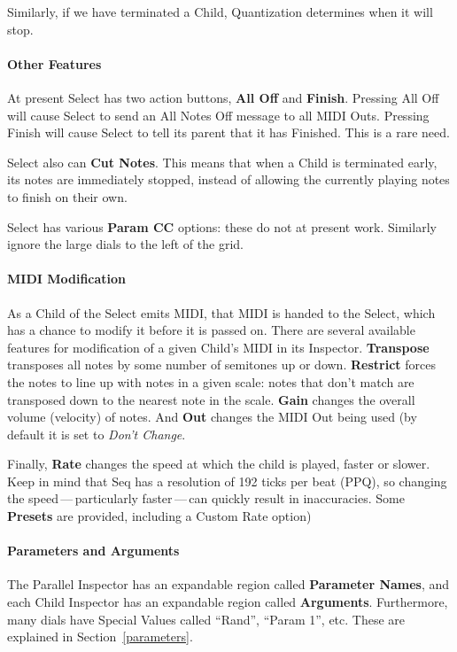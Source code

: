 \documentclass[twoside,10pt]{article}
\begin{document}
Similarly, if we have terminated a Child, Quantization determines when it will stop.

\paragraph{Other Features}

At present Select has two action buttons, {\bf All Off} and {\bf Finish}.  Pressing All Off will cause Select to send an All Notes Off message to all MIDI Outs.  Pressing Finish will cause Select to tell its parent that it has Finished.  This is a rare need.

Select also can {\bf Cut Notes}.  This means that when a Child is terminated early, its notes are immediately stopped, instead of allowing the currently playing notes to finish on their own.

Select has various {\bf Param CC} options: {\color{red} these do not at present work.}  Similarly ignore the large dials to the left of the grid.

\paragraph{MIDI Modification}

As a Child of the Select emits MIDI, that MIDI is handed to the Select, which has a chance to modify it before it is passed on.  There are several available features for modification of a given Child's MIDI in its Inspector.  {\bf Transpose} transposes all notes by some number of semitones up or down.  {\bf Restrict} forces the notes to line up with notes in a given scale: notes that don't match are transposed down to the nearest note in the scale.  {\bf Gain} changes the overall volume (velocity) of notes.  And {\bf Out} changes the MIDI Out being used (by default it is set to {\it Don't Change}.

Finally, {\bf Rate} changes the speed at which the child is played, faster or slower.  Keep in mind that Seq has a resolution of 192 ticks per beat (PPQ), so changing the speed\,---\,particularly faster\,---\,can quickly result in inaccuracies.    Some {\bf Presets} are provided, including a Custom Rate option)


\paragraph{Parameters and Arguments}

The Parallel Inspector has an expandable region called {\bf Parameter Names}, and each Child Inspector has an expandable region called {\bf Arguments}. Furthermore, many dials have Special Values called ``Rand'', ``Param 1'', etc.  These are explained in Section~\ref{parameters}.
\end{document}
